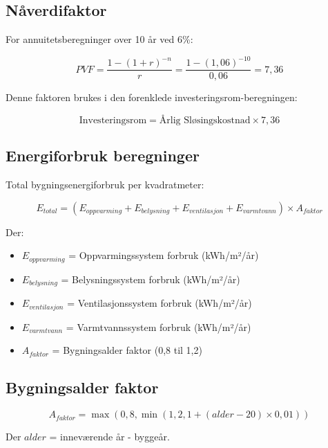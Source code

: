 \documentclass[12pt,a4paper]{article}
\begin{document}
\subsection{Nåverdifaktor}

For annuitetsberegninger over 10 år ved 6\%:

\begin{equation}
PVF = \frac{1 - (1 + r)^{-n}}{r} = \frac{1 - (1,06)^{-10}}{0,06} = 7,36
\end{equation}

Denne faktoren brukes i den forenklede investeringsrom-beregningen:

\begin{equation}
\text{Investeringsrom} = \text{Årlig Sløsingskostnad} \times 7,36
\end{equation}

\subsection{Energiforbruk beregninger}

Total bygningsenergiforbruk per kvadratmeter:

\begin{equation}
E_{total} = (E_{oppvarming} + E_{belysning} + E_{ventilasjon} + E_{varmtvann}) \times A_{faktor}
\end{equation}

Der:
\begin{itemize}
\item $E_{oppvarming}$ = Oppvarmingssystem forbruk (kWh/m²/år)
\item $E_{belysning}$ = Belysningssystem forbruk (kWh/m²/år)
\item $E_{ventilasjon}$ = Ventilasjonssystem forbruk (kWh/m²/år)
\item $E_{varmtvann}$ = Varmtvannssystem forbruk (kWh/m²/år)
\item $A_{faktor}$ = Bygningsalder faktor (0,8 til 1,2)
\end{itemize}

\subsection{Bygningsalder faktor}

\begin{equation}
A_{faktor} = \max(0,8, \min(1,2, 1 + (alder - 20) \times 0,01))
\end{equation}

Der $alder$ = inneværende år - byggeår.
\end{document}
